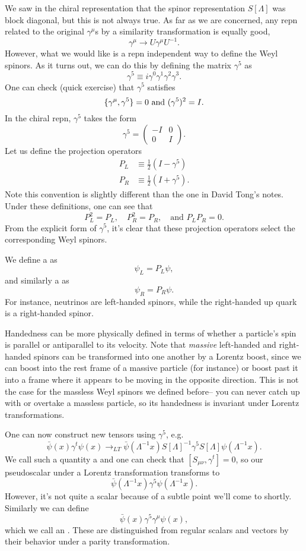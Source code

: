 We saw in the chiral representation that the spinor representation $S[\Lambda]$ was block diagonal, but this is not always true. As far as we are concerned, any repn related to the original $\gamma^\mu$s by a similarity transformation is equally good,
$$\gamma^\mu\to U\gamma^\mu U^{-1}.$$
However, what we would like is a repn independent way to define the Weyl spinors. As it turns out, we can do this by defining the matrix $\gamma^5$ as
$$\gamma^5 \equiv i \gamma^0 \gamma^1 \gamma^2 \gamma^3.$$
One can check (quick exercise) that $\gamma^5$ satisfies
$$\{\gamma^\mu,\gamma^5\}=0\text{ and }(\gamma^5)^2=I.$$
In the chiral repn, $\gamma^5$ takes the form
$$\gamma^5=\begin{pmatrix}
-I&0\\0&I
\end{pmatrix}.$$
Let us define the projection operators
\begin{align*}
    P_L & \equiv \frac{1}{2}(I-\gamma^5)\\
    P_R & \equiv \frac{1}{2}(I+\gamma^5).
\end{align*}
Note this convention is slightly different than the one in David Tong's notes. Under these definitions, one can see that
$$P_L^2=P_L,\quad P_R^2=P_R,\quad \text{and } P_LP_R =0.$$
From the explicit form of $\gamma^5$, it's clear that these projection operators select the corresponding Weyl spinors.
\begin{defn}
We define a  as
$$\psi_L=P_L \psi,$$
and similarly a  as
$$\psi_R=P_R \psi.$$
For instance, neutrinos are left-handed spinors, while the right-handed up quark is a right-handed spinor.

Handedness can be more physically defined in terms of whether a particle's spin is parallel or antiparallel to its velocity. Note that \emph{massive} left-handed and right-handed spinors can be transformed into one another by a Lorentz boost, since we can boost into the rest frame of a massive particle (for instance) or boost past it into a frame where it appears to be moving in the opposite direction. This is not the case for the massless Weyl spinors we defined before-- you can never catch up with or overtake a massless particle, so its handedness is invariant under Lorentz transformations.
\end{defn}
One can now construct new tensors using $\gamma^5$, e.g.
$$\bar \psi(x) \gamma^t \psi(x)\to_{LT} \bar \psi(\Lambda^{-1}x)S[\Lambda]^{-1}\gamma^5 S[\Lambda] \psi(\Lambda^{-1}x).$$
We call such a quantity a  and one can check that $[S_{\mu\nu},\gamma^t]=0$, so our pseudoscalar under a Lorentz transformation transforms to 
$$\bar\psi(\Lambda^{-1}x)\gamma^5 \psi(\Lambda^{-1}x).$$
However, it's not quite a scalar because of a subtle point we'll come to shortly. Similarly we can define
$$\bar \psi(x) \gamma^5 \gamma^\mu \psi(x),$$
which we call an . These are distinguished from regular scalars and vectors by their behavior under a parity transformation.

